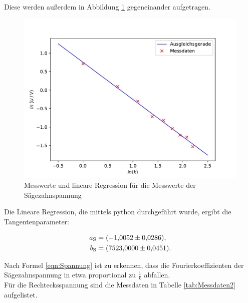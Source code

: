 Diese werden außerdem in Abbildung \ref{fig:Säge} gegeneinander aufgetragen.

\begin{figure}[H]
    \centering
    \includegraphics[scale=1.0]{content/plot1.pdf}
    \caption{Messwerte und lineare Regression für die Messwerte der Sägezahnspannung}
    \label{fig:Säge}
\end{figure}

Die Lineare Regression, die mittels python durchgeführt wurde, ergibt die Tangentenparameter:

\begin{align*}
    a_\text{S} &= \SI{-1.0052 \pm 0.0286}{}, \\
    b_\text{S} &= \SI{07523 \pm 0.0451}{}.
\end{align*}

Nach Formel \eqref{eqn:Spannung} ist zu erkennen, dass die Fourierkoeffizienten der Sägezahnspannung in etwa
proportional zu $\frac{1}{k}$ abfallen.
\\
Für die Rechtecksspannung sind die Messdaten in Tabelle \ref{tab:Messdaten2} aufgelistet.

